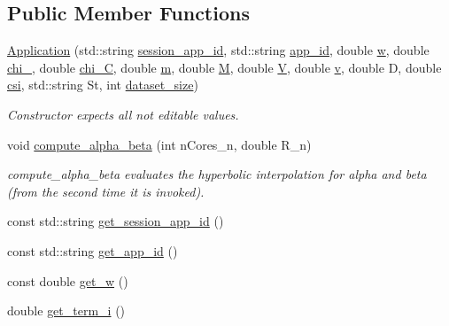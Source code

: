 \subsection*{Public Member Functions}
\begin{DoxyCompactItemize}
\item 
\hyperlink{classApplication_a3413eb5b5ba7bd2d1dfe2ce6d2e28c48}{Application} (std\-::string \hyperlink{classApplication_a6152c40564d526b9b60871c98f7a51c7}{session\-\_\-app\-\_\-id}, std\-::string \hyperlink{classApplication_a5cedee59cfd3cbf89d02174e2f521493}{app\-\_\-id}, double \hyperlink{classApplication_a89e171cf287b09ce4b37dd94c0d61e2b}{w}, double \hyperlink{classApplication_a6066fad4c229a6035652efd712d0d78c}{chi\-\_}, double \hyperlink{classApplication_a73d8a1604a2b2c99b14db1c8bd9c2798}{chi\-\_\-\-C}, double \hyperlink{classApplication_ad95ca8809237917d16779d7ed0013c8e}{m}, double \hyperlink{classApplication_a98cc47f6aa4ac3c70133d2922952ef7a}{M}, double \hyperlink{classApplication_a03a99fa3553c376653e53bb5f489c316}{V}, double \hyperlink{classApplication_a57853498c230af817bc4173169847bfc}{v}, double D, double \hyperlink{classApplication_a7c4d5b6d8d7b2c480008dbd958872ed2}{csi}, std\-::string St, int \hyperlink{classApplication_a83bcec93383a2816d9bbaa51b7dfa0c6}{dataset\-\_\-size})
\begin{DoxyCompactList}\small\item\em Constructor expects all not editable values. \end{DoxyCompactList}\item 
void \hyperlink{classApplication_a892d318a87da1f066843c63d64eb6b95}{compute\-\_\-alpha\-\_\-beta} (int n\-Cores\-\_\-n, double R\-\_\-n)
\begin{DoxyCompactList}\small\item\em compute\-\_\-alpha\-\_\-beta evaluates the hyperbolic interpolation for alpha and beta (from the second time it is invoked). \end{DoxyCompactList}\item 
const std\-::string \hyperlink{classApplication_a8c2e8eb2e76e8cb32ec7f6a41aba0758}{get\-\_\-session\-\_\-app\-\_\-id} ()
\item 
const std\-::string \hyperlink{classApplication_a4de60db623cbf250ea53805cd86cab06}{get\-\_\-app\-\_\-id} ()
\item 
const double \hyperlink{classApplication_a8fcbf0ab476dd0d53e7e20f37e3b0543}{get\-\_\-w} ()
\item 
double \hyperlink{classApplication_a19089a029251a3034747866c2084f4af}{get\-\_\-term\-\_\-i} ()

\end{DoxyCompactItemize}
